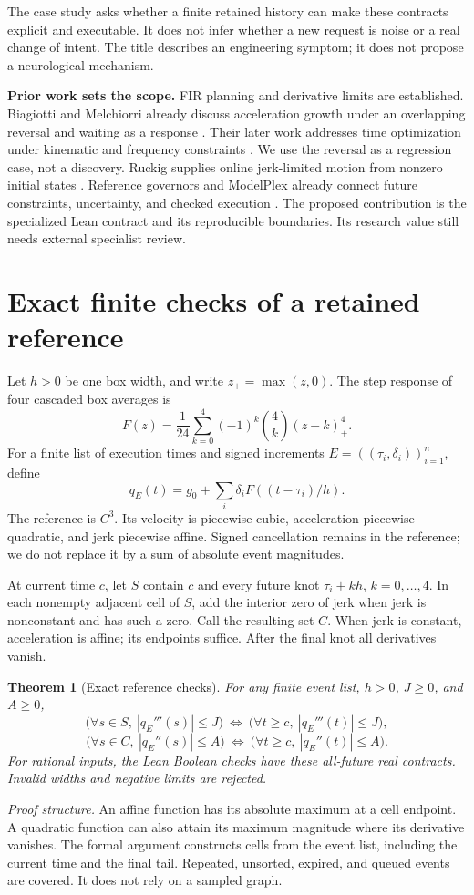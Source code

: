 \documentclass[10pt,letterpaper]{article}
\newtheorem{theorem}{Theorem}
\begin{document}
The case study asks whether a finite retained history can make these contracts
explicit and executable. It does not infer whether a new request is noise or a
real change of intent. The title describes an engineering symptom; it does not
propose a neurological mechanism.

\textbf{Prior work sets the scope.}
FIR planning and derivative limits are established. Biagiotti and Melchiorri
already discuss acceleration growth under an overlapping reversal and waiting
as a response \cite{fir2012}. Their later work addresses time optimization under
kinematic and frequency constraints \cite{fir2019}. We use the reversal as a
regression case, not a discovery. Ruckig supplies online jerk-limited motion from
nonzero initial states \cite{ruckig}. Reference governors and ModelPlex already
connect future constraints, uncertainty, and checked execution
\cite{governors,modelplex}. The proposed contribution is the specialized Lean
contract and its reproducible boundaries. Its research value still needs
external specialist review.

\section{Exact finite checks of a retained reference}
Let $h>0$ be one box width, and write $z_+=\max(z,0)$. The step response of four
cascaded box averages is
\[
 F(z)=\frac1{24}\sum_{k=0}^{4}(-1)^k {4\choose k}(z-k)_+^4.
\]
For a finite list of execution times and signed increments
$E=((\tau_i,\delta_i))_{i=1}^{n}$, define
\[
 q_E(t)=g_0+\sum_i\delta_i F((t-\tau_i)/h).
\]
The reference is $C^3$. Its velocity is piecewise cubic, acceleration piecewise
quadratic, and jerk piecewise affine. Signed cancellation remains in the
reference; we do not replace it by a sum of absolute event magnitudes.

At current time $c$, let $S$ contain $c$ and every future knot $\tau_i+kh$,
$k=0,\ldots,4$. In each nonempty adjacent cell of $S$, add the interior zero of
jerk when jerk is nonconstant and has such a zero. Call the resulting set $C$.
When jerk is constant, acceleration is affine; its endpoints suffice. After
the final knot all derivatives vanish.

\begin{theorem}[Exact reference checks]\label{thm:checks}
For any finite event list, $h>0$, $J\geq0$, and $A\geq0$,
\[
 \bigl(\forall s\in S,\ |q_E'''(s)|\leq J\bigr)
 \ \Longleftrightarrow\
 \bigl(\forall t\geq c,\ |q_E'''(t)|\leq J\bigr),
\]
\[
 \bigl(\forall s\in C,\ |q_E''(s)|\leq A\bigr)
 \ \Longleftrightarrow\
 \bigl(\forall t\geq c,\ |q_E''(t)|\leq A\bigr).
\]
For rational inputs, the Lean Boolean checks have these all-future real
contracts. Invalid widths and negative limits are rejected.
\end{theorem}
\textit{Proof structure.} An affine function has its absolute maximum at a cell
endpoint. A quadratic function can also attain its maximum magnitude where its
derivative vanishes. The formal argument constructs cells from the event list,
including the current time and the final tail. Repeated, unsorted, expired, and
queued events are covered. It does not rely on a sampled graph.
\end{document}
